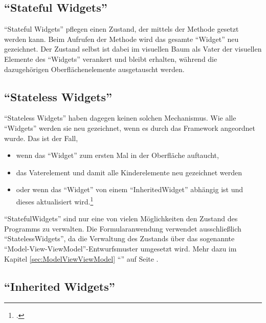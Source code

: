 \subsection{\enquote{Stateful Widgets}}

\enquote{Stateful Widgets} pflegen einen Zustand, der mittels der Methode  gesetzt werden kann.
Beim Aufrufen der Methode wird das gesamte \enquote{Widget} neu gezeichnet.
Der Zustand selbst ist dabei im visuellen Baum als Vater der visuellen Elemente des \enquote{Widgets} verankert und bleibt erhalten, während die dazugehörigen Oberflächenelemente ausgetauscht werden.

\subsection{\enquote{Stateless Widgets}}


\enquote{Stateless Widgets} haben dagegen keinen solchen Mechanismus. 
Wie alle \enquote{Widgets} werden sie neu gezeichnet, wenn es durch das Framework angeordnet wurde.
Das ist der Fall,
\begin{itemize}[topsep=0pt,itemsep=-1ex,partopsep=1ex,parsep=1ex]
  \item wenn das \enquote{Widget} zum ersten Mal in der Oberfläche auftaucht,
  \item das Vaterelement und damit alle Kinderelemente neu gezeichnet werden
  \item oder wenn das \enquote{Widget} von einem \enquote{InheritedWidget} abhängig ist und dieses aktualisiert wird.\footcite[Vgl.][]{StatelessWidget}
\end{itemize}


\enquote{StatefulWidgets} sind nur eine von vielen Möglichkeiten den Zustand des Programms zu verwalten.
Die Formularanwendung verwendet ausschließlich \enquote{StatelessWidgets}, da die Verwaltung des Zustands über das sogenannte \enquote{Model-View-ViewModel}-Entwurfsmuster umgesetzt wird.
Mehr dazu im Kapitel \ref{sec:ModelViewViewModel} \enquote{} auf Seite \pageref{sec:ModelViewViewModel}.

\subsection{\enquote{Inherited Widgets}}

